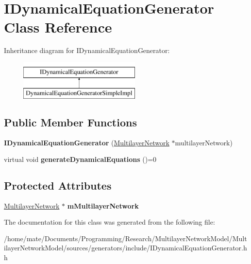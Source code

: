 \hypertarget{classIDynamicalEquationGenerator}{}\section{I\+Dynamical\+Equation\+Generator Class Reference}
\label{classIDynamicalEquationGenerator}
Inheritance diagram for I\+Dynamical\+Equation\+Generator\+:\begin{figure}[H]
\begin{center}
\leavevmode
\includegraphics[height=2.000000cm]{classIDynamicalEquationGenerator}
\end{center}
\end{figure}
\subsection*{Public Member Functions}
\begin{DoxyCompactItemize}
\item 
{\bfseries I\+Dynamical\+Equation\+Generator} (\hyperlink{classMultilayerNetwork}{Multilayer\+Network} $\ast$multilayer\+Network)\hypertarget{classIDynamicalEquationGenerator_a7c4ee27a9153c6c71c56363509e9db50}{}\label{classIDynamicalEquationGenerator_a7c4ee27a9153c6c71c56363509e9db50}

\item 
virtual void {\bfseries generate\+Dynamical\+Equations} ()=0\hypertarget{classIDynamicalEquationGenerator_a23867fb164b2e17a98f2acde2f6d658e}{}\label{classIDynamicalEquationGenerator_a23867fb164b2e17a98f2acde2f6d658e}

\end{DoxyCompactItemize}
\subsection*{Protected Attributes}
\begin{DoxyCompactItemize}
\item 
\hyperlink{classMultilayerNetwork}{Multilayer\+Network} $\ast$ {\bfseries m\+Multilayer\+Network}\hypertarget{classIDynamicalEquationGenerator_aa20ebd4982dc045c28dba4e0fb63c585}{}\label{classIDynamicalEquationGenerator_aa20ebd4982dc045c28dba4e0fb63c585}

\end{DoxyCompactItemize}


The documentation for this class was generated from the following file\+:\begin{DoxyCompactItemize}
\item 
/home/mate/\+Documents/\+Programming/\+Research/\+Multilayer\+Network\+Model/\+Multilayer\+Network\+Model/sources/generators/include/I\+Dynamical\+Equation\+Generator.\+hh\end{DoxyCompactItemize}
